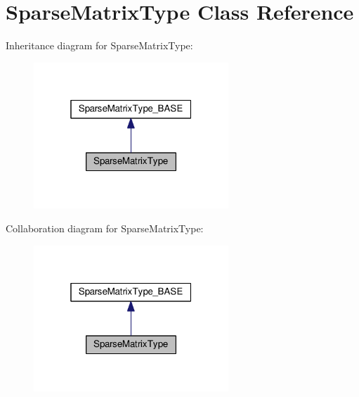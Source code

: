 \hypertarget{class_sparse_matrix_type}{}\section{Sparse\+Matrix\+Type Class Reference}
\label{class_sparse_matrix_type}


Inheritance diagram for Sparse\+Matrix\+Type\+:\nopagebreak
\begin{figure}[H]
\begin{center}
\leavevmode
\includegraphics[width=208pt]{class_sparse_matrix_type__inherit__graph}
\end{center}
\end{figure}


Collaboration diagram for Sparse\+Matrix\+Type\+:\nopagebreak
\begin{figure}[H]
\begin{center}
\leavevmode
\includegraphics[width=208pt]{class_sparse_matrix_type__coll__graph}
\end{center}
\end{figure}
